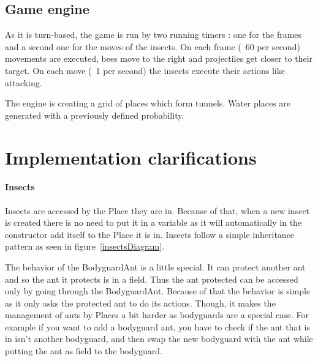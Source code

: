 \documentclass[
	a4paper
]{article}
\begin{document}
	\subsection{Game engine}
	
	As it is turn-based, the game is run by two running timers : one for the frames and a second one for the moves of the insects. %
On each frame (~60 per second) movements are executed, bees move to the right and projectiles get closer to their target. %
On each move (~1 per second) the insects execute their actions like attacking.

The engine is creating a grid of places which form tunnels. %
Water places are generated with a previously defined probability.


\newpage

\section{Implementation clarifications}

\paragraph{Insects} Insects are accessed by the Place they are in. %
Because of that, when a new insect is created there is no need to put it in a variable as it will %
automatically in the constructor add itself to the Place it is in. %
Insects follow a simple inheritance pattern as seen in figure~\ref{insectsDiagram}.

The behavior of the BodyguardAnt is a little special. %
It can protect another ant and so the ant it protects is in a field. %
Thus the ant protected can be accessed only by going through the BodyguardAnt. %
Because of that the behavior is simple as it only asks the protected ant to do its actions. %
Though, it makes the management of ants by Places a bit harder as bodyguards are a special case. %
For example if you want to add a bodyguard ant, you have to check if the ant that is in isn't another bodyguard, %
and then swap the new bodyguard with the ant while putting the ant as field to the bodyguard.
\end{document}
